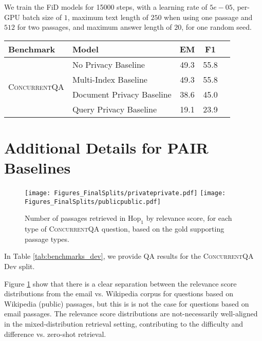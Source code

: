 \documentclass{article}
\newcommand{\datasetname}{\textsc{ConcurrentQA}\xspace}
\newcommand{\problemshortname}{\textsc{PAIR}\xspace}
\begin{document}
We train the FiD models for 15000 steps, with a learning rate of $5e-05$, per-GPU batch size of $1$, maximum text length of $250$ when using one passage and $512$ for two passages, and maximum answer length of $20$, for one random seed. 



\begin{table*}[t!]
    \begin{center}
\normalsize
    \begin{tabular}{llccc}
    \toprule
    Benchmark   &  Model  &    EM  &   F1  \\
    \midrule
    \multirow{4}{*}{\datasetname}
    &  No Privacy Baseline         & 49.3 & 55.8  \\
    &  Multi-Index Baseline    & 49.3 & 55.8  \\
    &  Document Privacy Baseline & 38.6 & 45.0   \\
    &  Query Privacy  Baseline  & 19.1 & 23.9   \\
    \bottomrule
    \end{tabular}\normalsize
    \caption{Multi-hop QA datasets using MDR under each privacy setting. Here we include results for the \datasetname Dev split.}
    \vspace{-2mm}
    \label{tab:benchmarks_dev}
    \end{center}
\end{table*}

\section{Additional Details for \problemshortname Baselines}



\begin{figure}[t!]
    \centering
    \texttt{[image: Figures\_FinalSplits/privateprivate.pdf]}
    \texttt{[image: Figures\_FinalSplits/publicpublic.pdf]}
    \caption[width=0.9\linewidth]{Number of passages retrieved in $\mathrm{Hop_1}$ by relevance score, for each type of \datasetname question, based on the gold supporting passage types.} 
    \label{fig:relevancescores}
\end{figure}


In Table \ref{tab:benchmarks_dev}, we provide QA results for the \datasetname Dev split. 

Figure \ref{fig:relevancescores} show that there is a clear separation between the relevance score distributions from the email vs. Wikipedia corpus for questions based on Wikipedia (public) passages, but this is is not the case for questions based on email passages. The relevance score distributions are not-necessarily well-aligned in the mixed-distribution retrieval setting, contributing to the difficulty and difference vs. zero-shot retrieval.
\end{document}
